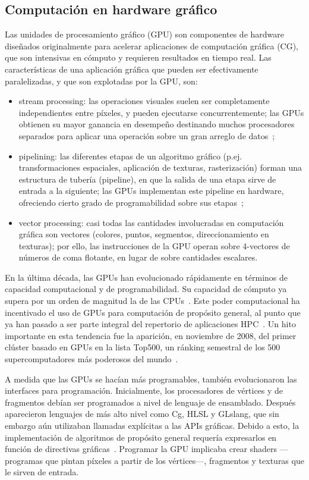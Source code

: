 \documentclass[11pt,spanish]{article}
\begin{document}
\subsection{Computación en hardware gráfico}
Las unidades de procesamiento gráfico (GPU) son componentes de hardware diseñados
originalmente para acelerar aplicaciones de computación gráfica (CG), que son
intensivas en cómputo y requieren resultados en tiempo real.  Las
características de una aplicación gráfica que pueden ser efectivamente
paralelizadas, y que son explotadas por la GPU, son:
\begin{itemize}
  \item stream processing:
    las operaciones visuales suelen ser completamente independientes entre
    píxeles, y pueden ejecutarse concurrentemente;  las GPUs obtienen su mayor
    ganancia en desempeño destinando muchos procesadores
    separados para aplicar una operación sobre un gran arreglo de
    datos~\cite[\S3.2]{gpupp};
  \item pipelining:
    las diferentes etapas de un algoritmo gráfico (p.ej.
    transformaciones espaciales, aplicación de texturas, rasterización)
    forman una estructura de tubería (pipeline), en que la salida de una etapa
    sirve de entrada a la siguiente;  las GPUs implementan este pipeline en
    hardware, ofreciendo cierto grado de programabilidad sobre sus
    etapas~\cite[\S3.1]{pygpu};
  \item vector processing:
    casi todas las cantidades involucradas en computación
    gráfica son vectores (colores, puntos, segmentos, direccionamiento en
    texturas); por ello, las instrucciones de la GPU operan sobre 4-vectores de
    números de coma flotante, en lugar de sobre cantidades escalares.
    \cite[\S3.3]{gpupp}
\end{itemize}

En la última década, las GPUs han evolucionado rápidamente en términos de
capacidad computacional y de programabilidad.  Su capacidad de cómputo ya supera
por un orden de magnitud la de las CPUs~\cite{gpupp}.  Este poder computacional ha
incentivado el uso de GPUs para computación de propósito general, al punto que
ya han pasado a ser parte integral del repertorio de aplicaciones
HPC~\cite{gpu-computing}.
Un hito importante en esta tendencia fue la aparición, en noviembre de 2008, del
primer clúster basado en GPUs en la lista Top500, un ránking semestral de los
500 supercomputadores más poderosos del mundo~\cite{top500}.

A medida que las GPUs se hacían más programables, también evolucionaron las
interfaces para programación.  Inicialmente, los procesadores de
vértices y de fragmentos debían ser programados a nivel de lenguaje de
ensamblado.
Después aparecieron lenguajes de más alto nivel como Cg, HLSL y GLslang,
que sin embargo aún utilizaban llamadas explícitas a las APIs gráficas.
Debido a esto, la implementación de algoritmos de propósito general
requería expresarlos en función de directivas gráficas~\cite[\S2.2]{brookgpu}.
Programar la GPU implicaba crear shaders ---programas que pintan píxeles a partir
de los vértices---, fragmentos y texturas que le sirven de entrada.
\end{document}
